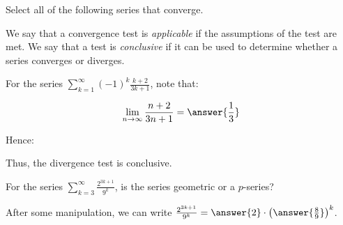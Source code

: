 \documentclass{ximera}
\author{Jim Talamo}
\begin{document}
\begin{exercise}

Select all of the following series that converge.  

\begin{selectAll}
\end{selectAll}

\begin{hint}
We say that a convergence test is \emph{applicable} if the assumptions of the test are met.  We say that a test is \emph{conclusive} if it can be used to determine whether a series converges or diverges.

\begin{question}
For the series $\sum_{k=1}^{\infty} (-1)^k \frac{k+2}{3k+1}$, note that:

\[
\lim_{n \to \infty} \frac{n+2}{3n+1} = \answer{\frac{1}{3}}
\]

Hence:

\begin{multipleChoice}
\end{multipleChoice}

Thus, the divergence test is conclusive.
\end{question}



\begin{question}
For the series $\sum_{k=3}^{\infty} \frac{2^{3k+1}}{9^k}$, is the series geometric or a $p$-series?

\begin{multipleChoice}
\end{multipleChoice}

After some manipulation, we can write $ \frac{2^{3k+1}}{9^k} = \answer{2} \cdot \left(\answer{\frac{8}{9}}\right)^k$.


\end{question}
\end{hint}
\end{exercise}
\end{document}
